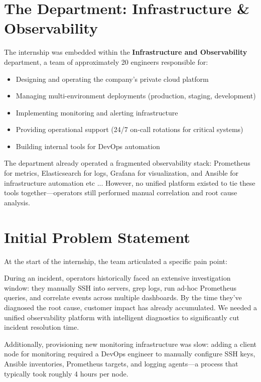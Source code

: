 \documentclass[12pt,a4paper]{report}
\begin{document}
\section{The Department: Infrastructure \& Observability}

The internship was embedded within the \textbf{Infrastructure and Observability} department, a team of approximately 20 engineers responsible for:

\begin{itemize}
  \item Designing and operating the company's private cloud platform
  \item Managing multi-environment deployments (production, staging, development)
  \item Implementing monitoring and alerting infrastructure
  \item Providing operational support (24/7 on-call rotations for critical systems)
  \item Building internal tools for DevOps automation
\end{itemize}

The department already operated a fragmented observability stack: Prometheus for metrics, Elasticsearch for logs, Grafana for visualization, and Ansible for infrastructure automation etc ... However, no unified platform existed to tie these tools together—operators still performed manual correlation and root cause analysis.

\section{Initial Problem Statement}

At the start of the internship, the team articulated a specific pain point:

During an incident, operators historically faced an extensive investigation window: they manually SSH into servers, grep logs, run ad-hoc Prometheus queries, and correlate events across multiple dashboards. By the time they've diagnosed the root cause, customer impact has already accumulated. We needed a unified observability platform with intelligent diagnostics to significantly cut incident resolution time.

Additionally, provisioning new monitoring infrastructure was slow: adding a client node for monitoring required a DevOps engineer to manually configure SSH keys, Ansible inventories, Prometheus targets, and logging agents—a process that typically took roughly 4 hours per node.
\end{document}
